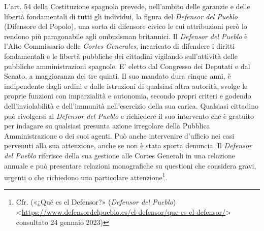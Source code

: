 \documentclass[12pt,it,a4paper,]{report}
\begin{document}
L'art. 54 della Costituzione spagnola prevede, nell'ambito delle
garanzie e delle libertà fondamentali di tutti gli individui, la figura
del \emph{Defensor del Pueblo} (Difensore del Popolo), una sorta di
difensore civico le cui attribuzioni però lo rendono più paragonabile
agli ombudsman britannici. Il \emph{Defensor del Pueblo} è l'Alto
Commissario delle \emph{Cortes Generales}, incaricato di difendere i
diritti fondamentali e le libertà pubbliche dei cittadini vigilando
sull'attività delle pubbliche amministrazioni spagnole. E' eletto dal
Congresso dei Deputati e dal Senato, a maggioranza dei tre quinti. Il
suo mandato dura cinque anni, è indipendente dagli ordini e dalle
istruzioni di qualsiasi altra autorità, svolge le proprie funzioni con
imparzialità e autonomia, secondo propri criteri e godendo
\hspace{0pt}\hspace{0pt}dell'inviolabilità e dell'immunità
nell'esercizio della sua carica. Qualsiasi cittadino può rivolgersi al
\emph{Defensor del Pueblo} e richiedere il suo intervento che è gratuito
per indagare su qualsiasi presunta azione irregolare della Pubblica
Amministrazione o dei suoi agenti. Può anche intervenire d'ufficio nei
casi pervenuti alla sua attenzione, anche se non è stata sporta
denuncia. Il \emph{Defensor del Pueblo} riferisce della sua gestione
alle Cortes Generali in una relazione annuale e può presentare relazioni
monografiche su questioni che considera gravi, urgenti o che richiedono
una particolare attenzione\footnote{Cfr. ({«¿Qué es el Defensor?»}
  (\emph{Defensor del Pueblo})
  \textless{}\url{https://www.defensordelpueblo.es/el-defensor/que-es-el-defensor/}\textgreater{}
  consultato 24 gennaio 2023)}.
\end{document}

